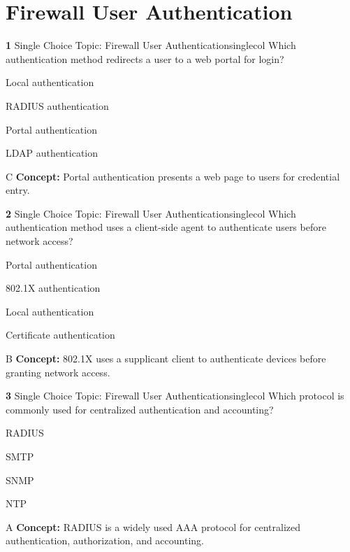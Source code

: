 \documentclass[10pt,a4paper]{article}
\begin{document}
\section{Firewall User Authentication}
\begin{qcard}{\color{white}\textbf{1} \hfill \small Single Choice \textbar{} Topic: Firewall User Authentication}{singlecol}
Which authentication method redirects a user to a web portal for login?

\begin{qoptions}
\item Local authentication
\item RADIUS authentication
\item Portal authentication
\item LDAP authentication
\end{qoptions}
\begin{explainbox}{C}
\textbf{Concept:} Portal authentication presents a web page to users for credential entry.
\end{explainbox}
\end{qcard}

\begin{qcard}{\color{white}\textbf{2} \hfill \small Single Choice \textbar{} Topic: Firewall User Authentication}{singlecol}
Which authentication method uses a client-side agent to authenticate users before network access?

\begin{qoptions}
\item Portal authentication
\item 802.1X authentication
\item Local authentication
\item Certificate authentication
\end{qoptions}
\begin{explainbox}{B}
\textbf{Concept:} 802.1X uses a supplicant client to authenticate devices before granting network access.
\end{explainbox}
\end{qcard}

\begin{qcard}{\color{white}\textbf{3} \hfill \small Single Choice \textbar{} Topic: Firewall User Authentication}{singlecol}
Which protocol is commonly used for centralized authentication and accounting?

\begin{qoptions}
\item RADIUS
\item SMTP
\item SNMP
\item NTP
\end{qoptions}
\begin{explainbox}{A}
\textbf{Concept:} RADIUS is a widely used AAA protocol for centralized authentication, authorization, and accounting.
\end{explainbox}
\end{qcard}
\end{document}
